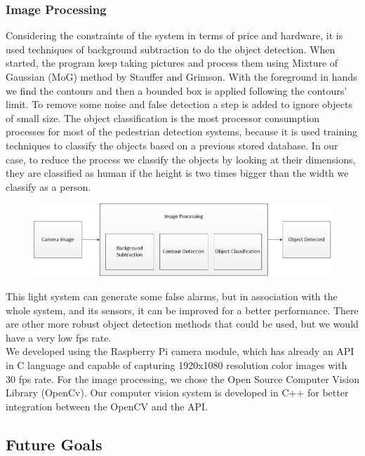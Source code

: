 \documentclass[journal,transmag]{IEEEtran}
\begin{document}
\subsubsection{Image Processing}
\- Considering the constraints of the system in terms of price and hardware, it is used techniques of background subtraction to do the object detection. When started, the program keep taking pictures and process them using Mixture of Gaussian (MoG) method by Stauffer and Grimson. With the foreground in hands we find the contours and then a bounded box is applied following the contours' limit. To remove some noise and false detection a step is added to ignore objects of small size. The object classification is the most processor consumption  processes for most of the pedestrian detection systems, because it is used training techniques to classify the objects based on a previous stored database. In our case, to reduce the process we classify the objects by looking at their dimensions, they are classified as human if the height is two times bigger than the width we classify as a person. \\
\begin{figure}[h!]
\centering
\includegraphics[scale=0.3]{imageprocessing.jpg}
\end{figure}	
\- This light system can generate some false alarms, but in association with the whole system, and its sensors, it can be improved for a better performance. There are other more robust object detection methods that could be used, but we would have a very low fps rate. \\
\- We developed using the Raspberry Pi camera module, which has already an API in C language and capable of capturing 1920x1080 resolution color images with 30 fps rate. For the image processing, we chose the Open Source Computer Vision Library (OpenCv). Our computer vision system is developed in C++ for better integration between the OpenCV and the API.\\

\subsection{Future Goals}
\end{document}
